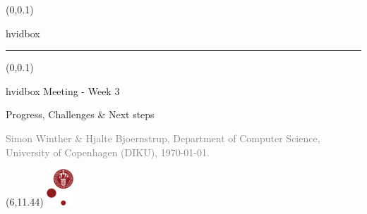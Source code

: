 \documentclass[t, 24pt]{beamer}
\newcommand{\weekcount}{3} %
\begin{document}
  {  \begin{frame}\begin{textblock*}{\textwidth}(0\textwidth,0.1\textheight) \begin{beamercolorbox}[wd=6.3cm,ht=7.7cm,sep=0.5cm]{hvidbox} \fontsize{4}{10}\selectfont {} \noindent\textcolor{KUrod}{\rule{5.3cm}{0.4pt}}\end{beamercolorbox}\end{textblock*} \begin{textblock*}{\textwidth}(0\textwidth,0.1\textheight) \begin{beamercolorbox}[wd=6.3cm,sep=0.5cm]{hvidbox} \Large \textcolor{KUrod}{Meeting - Week \weekcount} \vspace{0.5cm} \par \large Progress, Challenges \& Next steps \vspace{0.5cm} \par \textcolor{gray}{\scriptsize Simon Winther \& Hjalte Bjoernstrup, Department of Computer Science, University of Copenhagen (DIKU), \today.}\end{beamercolorbox}\end{textblock*} \begin{textblock}{1}(6,11.44) \includegraphics[width=1cm]{KU/KU-logo.png}\end{textblock}\end{frame} }
\end{document}
